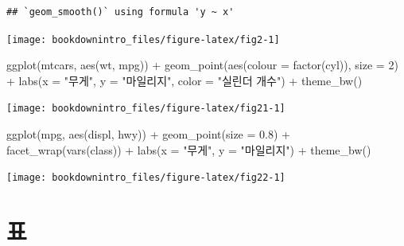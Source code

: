 \documentclass[
]{book}
\newenvironment{Shaded}{\begin{snugshade}}{\end{snugshade}}
\newcommand{\AttributeTok}[1]{\textcolor[rgb]{0.77,0.63,0.00}{#1}}
\newcommand{\DecValTok}[1]{\textcolor[rgb]{0.00,0.00,0.81}{#1}}
\newcommand{\FloatTok}[1]{\textcolor[rgb]{0.00,0.00,0.81}{#1}}
\newcommand{\FunctionTok}[1]{\textcolor[rgb]{0.00,0.00,0.00}{#1}}
\newcommand{\NormalTok}[1]{#1}
\newcommand{\SpecialCharTok}[1]{\textcolor[rgb]{0.00,0.00,0.00}{#1}}
\newcommand{\StringTok}[1]{\textcolor[rgb]{0.31,0.60,0.02}{#1}}
\theoremstyle{definition}
\theoremstyle{definition}
\theoremstyle{definition}
\theoremstyle{definition}
\theoremstyle{remark}
\begin{document}
\begin{verbatim}
## `geom_smooth()` using formula 'y ~ x'
\end{verbatim}

\begin{center}\texttt{[image: bookdownintro\_files/figure-latex/fig2-1]} \end{center}

\begin{Shaded}
\begin{Highlighting}[]
\FunctionTok{ggplot}\NormalTok{(mtcars, }\FunctionTok{aes}\NormalTok{(wt, mpg)) }\SpecialCharTok{+} \FunctionTok{geom\_point}\NormalTok{(}\FunctionTok{aes}\NormalTok{(}\AttributeTok{colour =} \FunctionTok{factor}\NormalTok{(cyl)), }\AttributeTok{size =} \DecValTok{2}\NormalTok{) }\SpecialCharTok{+} 
    \FunctionTok{labs}\NormalTok{(}\AttributeTok{x =} \StringTok{"무게"}\NormalTok{, }\AttributeTok{y =} \StringTok{"마일리지"}\NormalTok{, }\AttributeTok{color =} \StringTok{"실린더 개수"}\NormalTok{) }\SpecialCharTok{+} \FunctionTok{theme\_bw}\NormalTok{()}
\end{Highlighting}
\end{Shaded}

\begin{center}\texttt{[image: bookdownintro\_files/figure-latex/fig21-1]} \end{center}

\begin{Shaded}
\begin{Highlighting}[]
\FunctionTok{ggplot}\NormalTok{(mpg, }\FunctionTok{aes}\NormalTok{(displ, hwy)) }\SpecialCharTok{+} \FunctionTok{geom\_point}\NormalTok{(}\AttributeTok{size =} \FloatTok{0.8}\NormalTok{) }\SpecialCharTok{+} \FunctionTok{facet\_wrap}\NormalTok{(}\FunctionTok{vars}\NormalTok{(class)) }\SpecialCharTok{+} 
    \FunctionTok{labs}\NormalTok{(}\AttributeTok{x =} \StringTok{"무게"}\NormalTok{, }\AttributeTok{y =} \StringTok{"마일리지"}\NormalTok{) }\SpecialCharTok{+} \FunctionTok{theme\_bw}\NormalTok{()}
\end{Highlighting}
\end{Shaded}

\begin{center}\texttt{[image: bookdownintro\_files/figure-latex/fig22-1]} \end{center}

\hypertarget{table}{%
\chapter{표}\label{table}}
\end{document}
